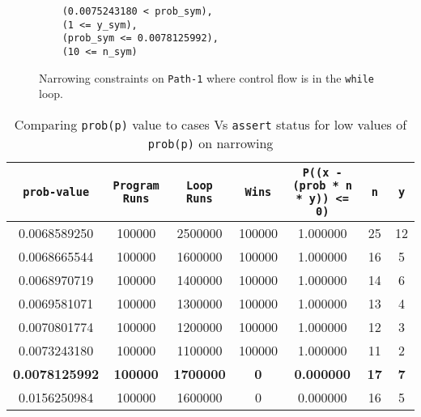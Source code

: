\documentclass[usenames,dvipsnames,acmsmall]{acmart}
\begin{document}
	\begin{figure}
\begin{verbatim}
	(0.0075243180 < prob_sym),
	(1 <= y_sym),
	(prob_sym <= 0.0078125992),
	(10 <= n_sym)
	\end{verbatim}
	\caption{Narrowing constraints on \texttt{Path-1} where control flow is in the \texttt{while} loop.}
\end{figure}
\begin{table}
	\centering
	\caption{Comparing \texttt{prob(p)} value to cases Vs \texttt{assert} status for low values of \texttt{prob(p)} on narrowing}
	\label{}
	\begin{tabular}{ c | c | c | c | c | c | c } 
		\toprule
		\texttt{prob-value} & \texttt{Program Runs}& \texttt{Loop Runs} & \texttt{Wins} & \texttt{P((x - (prob * n * y)) <= 0)}  & \texttt{n} & \texttt{y} \\ 
		\hline\hline
		0.0068589250 & 100000 & 2500000 & 100000 & 1.000000 & 25 & 12 \\ \hline
		0.0068665544 & 100000 & 1600000 & 100000 & 1.000000 & 16 & 5 \\ \hline
		0.0068970719 & 100000 & 1400000 & 100000 & 1.000000 & 14 & 6 \\ \hline
		0.0069581071 & 100000 & 1300000 & 100000 & 1.000000 & 13 & 4 \\ \hline
		0.0070801774 & 100000 & 1200000 & 100000 & 1.000000 & 12 & 3 \\ \hline
		0.0073243180 & 100000 & 1100000 & 100000 & 1.000000 & 11 & 2 \\ \hline
		{\textbf{ \color[HTML]{036400} 0.0078125992}} & {\textbf{\color[HTML]{036400} 100000}} & {\textbf{\color[HTML]{036400} 1700000}} & {\textbf{\color[HTML]{036400} 0}} & {\textbf{\color[HTML]{036400} 0.000000}} & {\textbf{\color[HTML]{036400} 17}} & {\textbf{\color[HTML]{036400} 7}} \\ \hline
		0.0156250984 & 100000 & 1600000 & 0 & 0.000000 & 16 & 5 \\ \hline
		\bottomrule
	\end{tabular}
\end{table}
\end{document}
